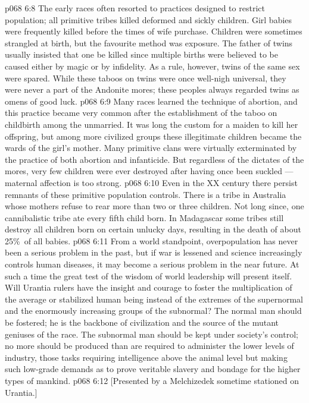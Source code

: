 \vs p068 6:8 The early races often resorted to practices designed to restrict population; all primitive tribes killed deformed and sickly children. Girl babies were frequently killed before the times of wife purchase. Children were sometimes strangled at birth, but the favourite method was exposure. The father of twins usually insisted that one be killed since multiple births were believed to be caused either by magic or by infidelity. As a rule, however, twins of the same sex were spared. While these taboos on twins were once well\hyp{}nigh universal, they were never a part of the Andonite mores; these peoples always regarded twins as omens of good luck.
\vs p068 6:9 Many races learned the technique of abortion, and this practice became very common after the establishment of the taboo on childbirth among the unmarried. It was long the custom for a maiden to kill her offspring, but among more civilized groups these illegitimate children became the wards of the girl’s mother. Many primitive clans were virtually exterminated by the practice of both abortion and infanticide. But regardless of the dictates of the mores, very few children were ever destroyed after having once been suckled --- maternal affection is too strong.
\vs p068 6:10 Even in the XX century there persist remnants of these primitive population controls. There is a tribe in Australia whose mothers refuse to rear more than two or three children. Not long since, one cannibalistic tribe ate every fifth child born. In Madagascar some tribes still destroy all children born on certain unlucky days, resulting in the death of about 25\%\ of all babies.
\vs p068 6:11 \pc From a world standpoint, overpopulation has never been a serious problem in the past, but if war is lessened and science increasingly controls human diseases, it may become a serious problem in the near future. At such a time the great test of the wisdom of world leadership will present itself. Will Urantia rulers have the insight and courage to foster the multiplication of the average or stabilized human being instead of the extremes of the supernormal and the enormously increasing groups of the subnormal? The normal man should be fostered; he is the backbone of civilization and the source of the mutant geniuses of the race. The subnormal man should be kept under society’s control; no more should be produced than are required to administer the lower levels of industry, those tasks requiring intelligence above the animal level but making such low\hyp{}grade demands as to prove veritable slavery and bondage for the higher types of mankind.
\vsetoff
\vs p068 6:12 [Presented by a Melchizedek sometime stationed on Urantia.]
\quizlink
